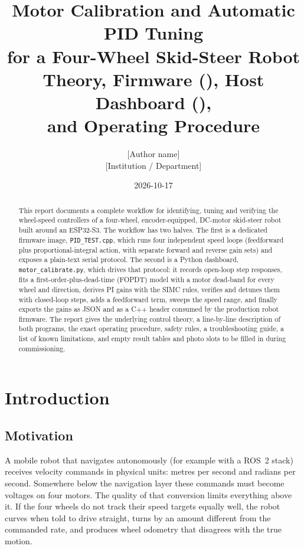 \documentclass[11pt,a4paper]{report}
\title{\textbf{Motor Calibration and Automatic PID Tuning\\for a Four-Wheel Skid-Steer Robot}\\[6pt]
\large Theory, Firmware (\code{PID\_TEST.cpp}), Host Dashboard (\code{motor\_calibrate.py}),\\and Operating Procedure}
\author{[Author name]\\[0pt] {[Institution / Department]}}
\date{2026-10-17}
\newcommand{\code}[1]{\texttt{#1}}
\begin{document}
\maketitle

\begin{abstract}
This report documents a complete workflow for identifying, tuning and verifying the wheel-speed controllers of a four-wheel, encoder-equipped, DC-motor skid-steer robot built around an ESP32-S3. The workflow has two halves. The first is a dedicated firmware image, \code{PID\_TEST.cpp}, which runs four independent speed loops (feedforward plus proportional-integral action, with separate forward and reverse gain sets) and exposes a plain-text serial protocol. The second is a Python dashboard, \code{motor\_calibrate.py}, which drives that protocol: it records open-loop step responses, fits a first-order-plus-dead-time (FOPDT) model with a motor dead-band for every wheel and direction, derives PI gains with the SIMC rules, verifies and detunes them with closed-loop steps, adds a feedforward term, sweeps the speed range, and finally exports the gains as JSON and as a C++ header consumed by the production robot firmware. The report gives the underlying control theory, a line-by-line description of both programs, the exact operating procedure, safety rules, a troubleshooting guide, a list of known limitations, and empty result tables and photo slots to be filled in during commissioning.
\end{abstract}

\tableofcontents
\listoffigures
\listoftables

\chapter{Introduction}

\section{Motivation}
A mobile robot that navigates autonomously (for example with a ROS~2 stack) receives velocity commands in physical units: metres per second and radians per second. Somewhere below the navigation layer these commands must become voltages on four motors. The quality of that conversion limits everything above it. If the four wheels do not track their speed targets equally well, the robot curves when told to drive straight, turns by an amount different from the commanded rate, and produces wheel odometry that disagrees with the true motion.
\end{document}

